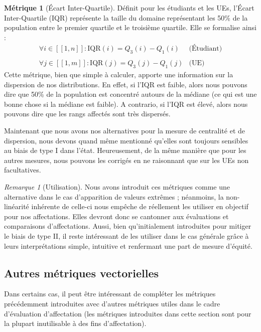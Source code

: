 \documentclass{rapport}
\theoremstyle{definition}
\theoremstyle{remark}
\theoremstyle{definition}
\newtheorem*{metric}{Métrique}
\theoremstyle{remark}
\newtheorem{remark}{Remarque}
\newcommand{\llbracket}{[\![}
\newcommand{\rrbracket}{]\!]}
\begin{document}
\begin{metric}[Écart Inter-Quartile]
    Définit pour les étudiants et les UEs, l'Écart Inter-Quartile (IQR) représente la taille du domaine représentant les 50\% de la population entre le premier quartile et le troisième quartile.
    Elle se formalise ainsi :
    $$
    \begin{matrix}
        \forall i\in\llbracket 1, n\rrbracket : \text{IQR}(i) = Q_3(i)-Q_1(i) & \text{(Étudiant)}\\
        &\\
        \forall j\in\llbracket 1, m\rrbracket : \text{IQR}(j) = Q_3(j)-Q_1(j) & \text{(UE)}
    \end{matrix}
    $$
    Cette métrique, bien que simple à calculer, apporte une information sur la dispersion de nos distributions.
    En effet, si l'IQR est faible, alors nous pouvons dire que 50\% de la population est concentré autours de la médiane (ce qui est une bonne chose si la médiane est faible).
    A contrario, si l'IQR est élevé, alors nous pouvons dire que les rangs affectés sont très dispersés.
\end{metric}

Maintenant que nous avons nos alternatives pour la mesure de centralité et de dispersion, nous devons quand même mentionné qu'elles sont toujours sensibles au biais de type I dans l'état.
Heureusement, de la même manière que pour les autres mesures, nous pouvons les corrigés en ne raisonnant que sur les UEs non facultatives.

\begin{remark}[Utilisation]
    Nous avons introduit ces métriques comme une alternative dans le cas d'apparition de valeurs extrêmes ; néanmoins, la non-linéarité inhérente de celle-ci nous empêche de réellement les utiliser en objectif pour nos affectations.
    Elles devront donc se cantonner aux évaluations et comparaisons d'affectations. Aussi, bien qu'initialement introduites pour mitiger le biais de type II, il reste intéressant de les utiliser dans le cas générale grâce à leurs interprétations simple, intuitive et renfermant une part de mesure d'équité.
\end{remark}

\subsection{Autres métriques vectorielles}
Dans certains cas, il peut être intéressant de compléter les métriques précédemment introduites avec d'autres métriques utiles dans le cadre d'évaluation d'affectation (les métriques introduites dans cette section sont pour la plupart inutilisable à des fins d'affectation).
\end{document}
